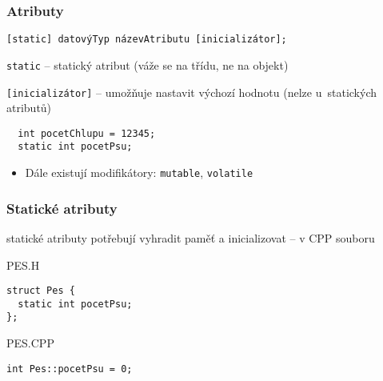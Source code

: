 
\begin{frame}[fragile]
\frametitle{Atributy}

\begin{noteblock}{}
\begin{lstlisting}
[static] datovýTyp názevAtributu [inicializátor];
\end{lstlisting}
\end{noteblock}

\begin{bitemize}
\item \lstinline|static| -- statický atribut (váže se na třídu, ne na objekt)
\item \lstinline|[inicializátor]| -- umožňuje nastavit výchozí hodnotu (nelze u~statických atributů)
\end{bitemize}

\begin{yesblock}
\begin{lstlisting}
  int pocetChlupu = 12345;  
  static int pocetPsu;
\end{lstlisting}
\end{yesblock}


\begin{bonusblock}{}
\begin{itemize}
\item Dále existují modifikátory: \lstinline|mutable|, \lstinline|volatile|
\end{itemize}
\end{bonusblock}
\end{frame}



\begin{frame}[fragile]
\frametitle{Statické atributy}
\begin{bitemize}
\item statické atributy potřebují vyhradit paměť a inicializovat -- v CPP souboru
\end{bitemize}

\begin{exampleblock}{PES.H}
\begin{lstlisting}
struct Pes {
  static int pocetPsu;
};
\end{lstlisting}
\end{exampleblock}

\begin{exampleblock}{PES.CPP}
\begin{lstlisting}
int Pes::pocetPsu = 0;
\end{lstlisting}
\end{exampleblock}

\end{frame}


